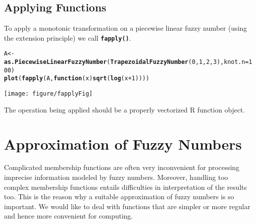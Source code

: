 \documentclass[11pt]{article}\usepackage[]{graphicx}\usepackage[]{color}
\makeatletter
\newcommand{\hlnum}[1]{\textcolor[rgb]{0.686,0.059,0.569}{#1}}%
\newcommand{\hlopt}[1]{\textcolor[rgb]{0,0,0}{#1}}%
\newcommand{\hlstd}[1]{\textcolor[rgb]{0.345,0.345,0.345}{#1}}%
\newcommand{\hlkwa}[1]{\textcolor[rgb]{0.161,0.373,0.58}{\textbf{#1}}}%
\newcommand{\hlkwb}[1]{\textcolor[rgb]{0.69,0.353,0.396}{#1}}%
\newcommand{\hlkwc}[1]{\textcolor[rgb]{0.333,0.667,0.333}{#1}}%
\newcommand{\hlkwd}[1]{\textcolor[rgb]{0.737,0.353,0.396}{\textbf{#1}}}%
\newenvironment{kframe}{%
 \def\at@end@of@kframe{}%
 \ifinner\ifhmode%
  \def\at@end@of@kframe{\end{minipage}}%
  \begin{minipage}{\columnwidth}%
 \fi\fi%
 \def\FrameCommand##1{\hskip\@totalleftmargin \hskip-\fboxsep
 \colorbox{shadecolor}{##1}\hskip-\fboxsep
     \hskip-\linewidth \hskip-\@totalleftmargin \hskip\columnwidth}%
 \MakeFramed {\advance\hsize-\width
   \@totalleftmargin\z@ \linewidth\hsize
   \@setminipage}}%
 {\par\unskip\endMakeFramed%
 \at@end@of@kframe}
\newenvironment{knitrout}{}{} %
\newcommand{\lang}[1]{\textsf{#1}\xspace}
\newcommand{\R}{\lang{R}}
\newcommand{\func}[1]{\texttt{\hlkwd{#1}}}
\makeatother
\begin{document}
\subsection{Applying Functions}


To apply a monotonic transformation on a piecewise linear fuzzy number
(using the extension principle) we call \func{fapply()}.

\begin{knitrout}\small
{}\color{fgcolor}\begin{kframe}
\begin{alltt}
\hlstd{A} \hlkwb{<-} \hlkwd{as.PiecewiseLinearFuzzyNumber}\hlstd{(}\hlkwd{TrapezoidalFuzzyNumber}\hlstd{(}\hlnum{0}\hlstd{,}\hlnum{1}\hlstd{,}\hlnum{2}\hlstd{,}\hlnum{3}\hlstd{),} \hlkwc{knot.n}\hlstd{=}\hlnum{100}\hlstd{)}
\hlkwd{plot}\hlstd{(}\hlkwd{fapply}\hlstd{(A,} \hlkwa{function}\hlstd{(}\hlkwc{x}\hlstd{)} \hlkwd{sqrt}\hlstd{(}\hlkwd{log}\hlstd{(x}\hlopt{+}\hlnum{1}\hlstd{))))}
\end{alltt}
\end{kframe}
\end{knitrout}

\begin{center}
\begin{knitrout}\small
{}\color{fgcolor}

{\centering \texttt{[image: figure/fapplyFig]} 

}



\end{knitrout}
\end{center}

\noindent
The operation being applied should be a properly
vectorized \R function object.









\section{Approximation of Fuzzy Numbers}\label{Sec:Approximation}


Complicated membership functions
are often very inconvenient for processing imprecise information modeled by
fuzzy numbers. Moreover, handling too complex membership
functions entails difficulties in interpretation of the results
too. This is the reason why a suitable approximation of fuzzy
numbers is so important. We would like to deal
with functions that are
simpler or more regular and hence more convenient for
computing.
\end{document}
